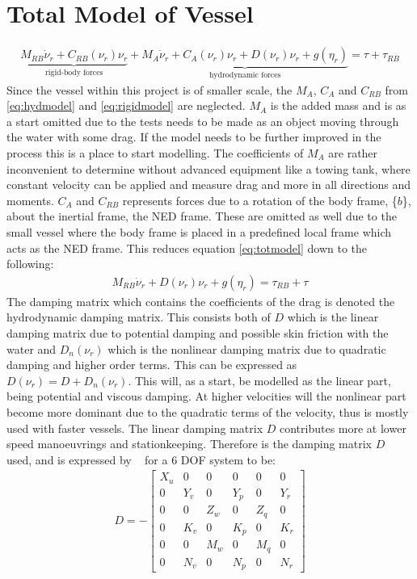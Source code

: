 \section{Total Model of Vessel}
\begin{align}
\underbrace{M_{RB} \dot \nu_r + C_{RB}(\nu_r)\nu_r}_{\text{rigid-body forces}} + \underbrace{M_A \dot \nu_r + C_A(\nu_r)\nu_r + D(\nu_r)\nu_r + g(\eta_r)}_{\text{hydrodynamic forces}}  = \tau + \tau_{RB}
\label{eq:totmodel}
\end{align}
\citep{fossen}  Since the vessel within this project is of smaller scale, the $M_A$, $C_A$ and $C_{RB}$ from \ref{eq:hydmodel} and \ref{eq:rigidmodel} are neglected. $M_A$ is the added mass and is as a start omitted due to the tests needs to be made as an object moving through the water with some drag. If the model needs to be further improved in the process this is a place to start modelling. The coefficients of $M_A$ are rather inconvenient to determine without advanced equipment like a towing tank, where constant velocity can be applied and measure drag and more in all directions and moments. $C_A$ and $C_{RB}$ represents forces due to a rotation of the body frame, \{$b$\}, about the inertial frame, the NED frame. These are omitted as well due to the small vessel where the body frame is placed in a predefined local frame which acts as the NED frame. This reduces equation \ref{eq:totmodel} down to the following:
\begin{align}
M_{RB} \dot \nu_r + D(\nu_r)\nu_r + g(\eta_r) = \tau_{RB} + \tau
\label{eq:reducedmodel}
\end{align}
The damping matrix which contains the coefficients of the drag is denoted the hydrodynamic damping matrix. This consists both of $D$ which is the linear damping matrix due to potential damping and possible skin friction with the water and $D_n(\nu_r)$ which is the nonlinear damping matrix due to quadratic damping and higher order terms. This can be expressed as $D(\nu_r) = D + D_n(\nu_r)$. This will, as a start, be modelled as the linear part, being potential and viscous damping. At higher velocities will the nonlinear part become more dominant due to the quadratic terms of the velocity, thus is mostly used with faster vessels. The linear damping matrix $D$ contributes more at lower speed manoeuvrings and stationkeeping. Therefore is the damping matrix $D$ used, and is expressed by ~\citep{fossen} for a 6 \ac{DOF} system to be:
\begin{align}
D =-
\begin{bmatrix}
X_u & 0 & 0 & 0 & 0 & 0\\
0 & Y_v & 0 & Y_p & 0 & Y_r\\
0 & 0 & Z_w & 0 & Z_q & 0\\
0 & K_v & 0 & K_p & 0 & K_r\\
0 & 0 & M_w & 0 & M_q & 0\\
0 & N_v & 0 & N_p & 0 & N_r
\end{bmatrix}
\label{eq:6dofd}
\end{align}

